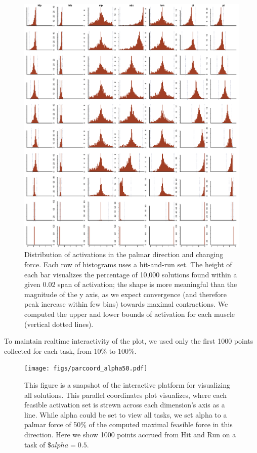 \begin{figure}[htbp]
\centering
\includegraphics[width=\textwidth]{figs/Z_alphaProgression1430924065026.pdf}
\caption{Distribution of activations in the palmar direction and changing force. Each row of histograms uses a hit-and-run set. The height of each bar visualizes the percentage of 10,000 solutions found within a given 0.02 span of activation; the shape is more meaningful than the magnitude of the y axis, as we expect convergence (and therefore peak increase within few bins) towards maximal contractions. We computed the upper and lower bounds of activation for each muscle (vertical dotted lines).}
\label{fig:Z_progression}
\end{figure}


To maintain realtime interactivity of the plot, we used only the first 1000 points collected for each task, from 10\% to 100\%.
\label{sub:parallel_coordinates}

\begin{figure}[htbp]
\centering
\texttt{[image: figs/parcoord\_alpha50.pdf]}
\caption{This figure is a snapshot of the interactive platform for visualizing all solutions. This parallel coordinates plot visualizes, where each feasible activation set is strewn across each dimension's axis as a line. While alpha could be set to view all tasks, we set alpha to a palmar force of 50\% of the computed maximal feasible force in this direction. Here we show 1000 points accrued from Hit and Run on a task of $\$alpha=0.5$.}
\label{fig:parcoord_full}
\end{figure}

